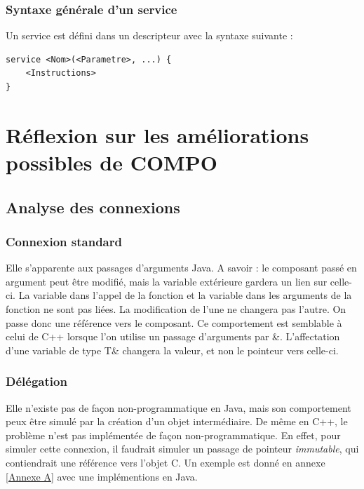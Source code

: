 \documentclass[11pt,a4paper,openany,oneside]{book}
\begin{document}
\subsection{Syntaxe générale d'un service}

Un service est défini dans un descripteur avec la syntaxe suivante : 
\begin{lstlisting}[language=Compo, frame=single, caption=Syntaxe de la définition d'un service]
service <Nom>(<Parametre>, ...) {
    <Instructions>
}
\end{lstlisting}

\chapter{Réflexion sur les améliorations possibles de COMPO}


\section{Analyse des connexions}

\subsection{Connexion standard}

Elle s'apparente aux passages d'arguments Java. A savoir : le composant passé en argument peut être modifié, mais la variable extérieure gardera un lien sur celle-ci. La variable dans l'appel de la fonction et la variable dans les arguments de la fonction ne sont pas liées. La modification de l'une ne changera pas l'autre. On passe donc une référence vers le composant. Ce comportement est semblable à celui de C++ lorsque l'on utilise un passage d'arguments par \&. L'affectation d'une variable de type T\& changera la valeur, et non le pointeur vers celle-ci.

\subsection{Délégation}
    		
Elle n'existe pas de façon non-programmatique en Java, mais son comportement peux être simulé par la création d'un objet intermédiaire. De même en C++, le problème n'est pas implémentée de façon non-programmatique. En effet, pour simuler cette connexion, il faudrait simuler un passage de pointeur \textit{immutable}, qui contiendrait une référence vers l'objet C. Un exemple est donné en annexe \ref{Annexe A} avec une implémentions en Java.
\end{document}
